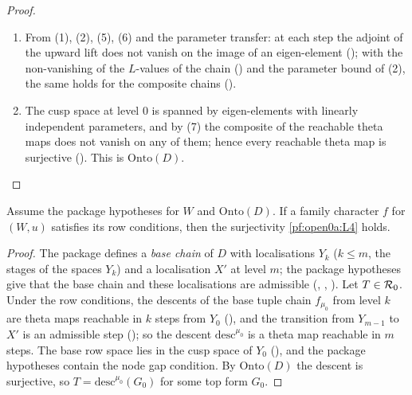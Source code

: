 \begin{proof}
\begin{enumerate}[label=(\arabic*),leftmargin=*]
\item From (1), (2), (5), (6) and the parameter transfer: at each step the adjoint of the upward lift does not vanish on
the image of an eigen-element (); with the
non-vanishing of the $L$-values of the chain () and the
parameter bound of (2), the same holds for the composite chains ().
\item The cusp space at level $0$ is spanned by eigen-elements with linearly independent parameters, and by (7) the
composite of the reachable theta maps does not vanish on any of them; hence every reachable theta map is surjective
(). This is $\mathrm{Onto}(D)$.\qedhere
\end{enumerate}
\end{proof}

\begin{lemma}\label{pf:open0a:linkonto}
Assume the package hypotheses for $W$ and $\mathrm{Onto}(D)$. If a family character $f$ for $(W,u)$ satisfies its row
conditions, then the surjectivity \ref{pf:open0a:L4} holds.
\end{lemma}

\begin{proof}
The package defines a \emph{base chain} of $D$ with localisations $Y_k$ ($k\le m$, the stages of the spaces $Y_k$) and a
localisation $X'$ at level $m$; the package hypotheses give that the base chain and these localisations are admissible
(, ,
). Let $T\in\mathcal{R}_0$. Under the row conditions, the
descents of the base tuple chain $f_{\mu_0}$ from level $k$ are theta maps reachable in $k$ steps from $Y_0$
(), and the transition from $Y_{m-1}$ to $X'$ is an admissible step
(); so the descent $\mathrm{desc}^{\mu_0}$ is a theta map
reachable in $m$ steps. The base row space lies in the cusp space of $Y_0$
(), and the package hypotheses contain the node gap
condition. By $\mathrm{Onto}(D)$ the descent is surjective, so $T=\mathrm{desc}^{\mu_0}(G_0)$ for some top form $G_0$.
\end{proof}

